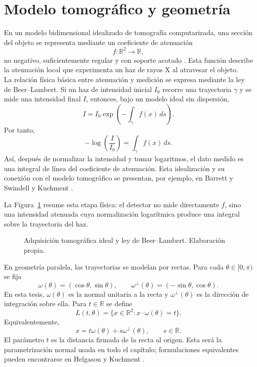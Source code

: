 \section{Modelo tomográfico y geometría}

En un modelo bidimensional idealizado de tomografía computarizada, una sección del objeto se representa mediante un coeficiente de atenuación
\[
f:\mathbb R^2\to\mathbb R,
\]
no negativo, suficientemente regular y con soporte acotado \cite[Sec.~5.3.1, pp.~23--25]{kuchment2014}. Esta función describe la atenuación local que experimenta un haz de rayos X al atravesar el objeto.\\

La relación física básica entre atenuación y medición se expresa mediante la ley de Beer--Lambert. Si un haz de intensidad inicial $I_0$ recorre una trayectoria $\gamma$ y se mide una intensidad final $I$, entonces, bajo un modelo ideal sin dispersión,
\[
I=I_0\exp\left(-\int_\gamma f(x)\,ds\right).
\]
Por tanto,
\[
-\log\left(\frac{I}{I_0}\right)
=
\int_\gamma f(x)\,ds.
\]
Así, después de normalizar la intensidad y tomar logaritmos, el dato medido es una integral de línea del coeficiente de atenuación. Esta idealización y su conexión con el modelo tomográfico se presentan, por ejemplo, en Barrett y Swindell \cite{barrett_swindell1996} y Kuchment \cite[Sec.~5.3.1, pp.~23--25]{kuchment2014}.

La Figura~\ref{fig:beer-lambert} resume esta etapa física: el detector no mide directamente $f$, sino una intensidad atenuada cuya normalización logarítmica produce una integral sobre la trayectoria del haz.

\begin{figure}[htbp]
\centering
\resizebox{0.86\textwidth}{!}{}
\caption{Adquisición tomográfica ideal y ley de Beer--Lambert. Elaboración propia.}
\label{fig:beer-lambert}
\end{figure}

En geometría paralela, las trayectorias se modelan por rectas. Para cada $\theta\in[0,\pi)$ se fija
\[
\omega(\theta)=(\cos\theta,\sin\theta),
\qquad
\omega^\perp(\theta)=(-\sin\theta,\cos\theta).
\]
En esta tesis, $\omega(\theta)$ es la normal unitaria a la recta y $\omega^\perp(\theta)$ es la dirección de integración sobre ella. Para $t\in\mathbb R$ se define
\[
L(t,\theta)
=
\{x\in\mathbb R^2: x\cdot\omega(\theta)=t\}.
\]
Equivalentemente,
\[
x=t\omega(\theta)+s\omega^\perp(\theta),
\qquad s\in\mathbb R.
\]
El parámetro $t$ es la distancia firmada de la recta al origen. Esta será la parametrización normal usada en todo el capítulo; formulaciones equivalentes pueden encontrarse en Helgason \cite{helgason1999} y Kuchment \cite[Sec.~5.3.4, pp.~27--28]{kuchment2014}.\\


